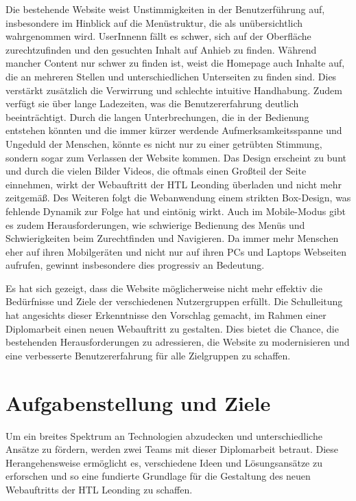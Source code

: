 Die bestehende Website weist Unstimmigkeiten in der Benutzerführung auf, 
insbesondere im Hinblick auf die Menüstruktur, die als unübersichtlich wahrgenommen wird. 
UserInnenn fällt es schwer, sich auf der Oberfläche zurechtzufinden und den gesuchten Inhalt auf Anhieb zu finden. 
Während mancher Content nur schwer zu finden ist, weist die Homepage auch Inhalte auf, 
die an mehreren Stellen und unterschiedlichen Unterseiten zu finden sind. Dies verstärkt zusätzlich 
die Verwirrung und schlechte intuitive Handhabung. Zudem verfügt sie über lange Ladezeiten, was die 
Benutzererfahrung deutlich beeinträchtigt. Durch die langen Unterbrechungen, 
die in der Bedienung entstehen könnten und die immer kürzer werdende Aufmerksamkeitsspanne und Ungeduld der Menschen, 
könnte es nicht nur zu einer getrübten Stimmung, sondern sogar zum Verlassen der Website kommen. Das Design erscheint 
zu bunt und durch die vielen Bilder Videos, die oftmals einen Großteil der Seite einnehmen, 
wirkt der Webauftritt der HTL Leonding überladen und nicht mehr zeitgemäß. Des Weiteren folgt die Webanwendung einem strikten
Box-Design, was fehlende Dynamik zur Folge hat und eintönig wirkt. Auch im Mobile-Modus gibt es zudem Herausforderungen,
wie schwierige Bedienung des Menüs und Schwierigkeiten beim Zurechtfinden und Navigieren. Da immer mehr Menschen eher auf 
ihren Mobilgeräten und nicht nur auf ihren PCs und Laptops Webseiten aufrufen, gewinnt insbesondere dies progressiv an Bedeutung.

Es hat sich gezeigt, dass die Website möglicherweise nicht mehr effektiv die Bedürfnisse und 
Ziele der verschiedenen Nutzergruppen erfüllt. Die Schulleitung hat angesichts dieser Erkenntnisse den Vorschlag gemacht, 
im Rahmen einer Diplomarbeit einen neuen Webauftritt zu gestalten. Dies bietet die Chance, die bestehenden 
Herausforderungen zu adressieren, die Website zu modernisieren und eine verbesserte Benutzererfahrung für alle Zielgruppen zu schaffen.


\section{Aufgabenstellung und Ziele}
Um ein breites Spektrum an Technologien abzudecken und unterschiedliche Ansätze zu fördern, werden zwei Teams mit dieser Diplomarbeit betraut. 
Diese Herangehensweise ermöglicht es, verschiedene Ideen und Lösungsansätze zu erforschen und so eine fundierte Grundlage für die Gestaltung 
des neuen Webauftritts der HTL Leonding zu schaffen.

